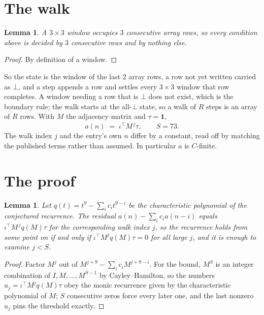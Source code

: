 \documentclass[11pt,a4paper]{article}
\theoremstyle{plain}
\newtheorem{lemma}[theorem]{Lemma}
\theoremstyle{definition}
\begin{document}
\section{The walk}

\begin{lemma}\label{lem:win}
A $3\times3$ window occupies $3$ consecutive array rows, so every condition above is
decided by $3$ consecutive rows and by nothing else.
\end{lemma}

\begin{proof}
By definition of a window.
\end{proof}

So the state is the window of the last $2$ array rows, a row not yet written carried as
$\bot$, and a step appends a row and settles every $3\times3$ window that row completes. A
window needing a row that is $\bot$ does not exist, which is the boundary rule; the walk starts
at the all-$\bot$ state, so a walk of $R$ steps is an array of $R$ rows. With $M$ the adjacency
matrix and $\tau=\mathbf{1}$,
\[
a(n)\;=\;\iota^{\!\top}M^{\,j}\tau ,\qquad S=73.
\]
The walk index $j$ and the entry's own $n$ differ by a constant, read off by matching the
published terms rather than assumed. In particular $a$ is $C$-finite.

\section{The proof}

\begin{lemma}\label{lem:crit}
Let $q(t)=t^{9}-\sum_i c_it^{9-i}$ be the characteristic polynomial of the
conjectured recurrence. The residual $a(n)-\sum_ic_ia(n-i)$ equals
$\iota^{\!\top}M^{\,j}q(M)\tau$ for the corresponding walk index $j$, so the recurrence
holds from some point on if and only if $\iota^{\!\top}M^{j}q(M)\tau=0$ for all large $j$,
and it is enough to examine $j<S$.
\end{lemma}

\begin{proof}
Factor $M^{j}$ out of $M^{j+9}-\sum_ic_iM^{j+9-i}$. For the bound, $M^{S}$
is an integer combination of $I,M,\dots,M^{S-1}$ by Cayley--Hamilton, so the numbers
$u_j=\iota^{\!\top}M^{j}q(M)\tau$ obey the monic recurrence given by the characteristic
polynomial of $M$; $S$ consecutive zeros force every later one, and the last nonzero $u_j$
pins the threshold exactly.
\end{proof}
\end{document}
